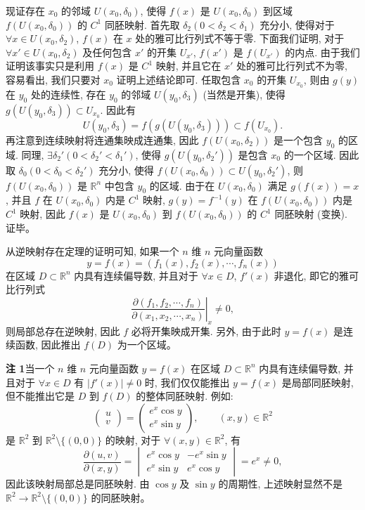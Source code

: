 \documentclass[UTF8, 12pt, fontset=fandol, oneside]{ctexart}
\begin{document}
现证存在 $x_0$ 的邻域 $U(x_0,\delta_0)$, 使得 $f(x)$ 是 $U(x_0,\delta_0)$ 到区域 $f(U(x_0,\delta_0))$ 的 $C^1$ 同胚映射. 首先取 $\delta_2(0<\delta_2<\delta_1)$ 充分小, 使得对于 $\forall x\in U(x_0,\delta_2)$, $f(x)$ 在 $x$ 处的雅可比行列式不等于零. 下面我们证明, 对于 $\forall x'\in U(x_0,\delta_2)$ 及任何包含 $x'$ 的开集 $U_{x'}$, $f(x')$ 是 $f(U_{x'})$ 的内点. 由于我们证明该事实只是利用 $f(x)$ 是 $C^1$ 映射, 并且它在 $x'$ 处的雅可比行列式不为零, 容易看出, 我们只要对 $x_0$ 证明上述结论即可. 任取包含 $x_0$ 的开集 $U_{x_0}$, 则由 $g(y)$ 在 $y_0$ 处的连续性, 存在 $y_0$ 的邻域 $U(y_0,\delta_3)$ (当然是开集), 使得 $g(U(y_0,\delta_3))\subset U_{x_0}$. 因此有
\[
  U(y_0,\delta_3)=f(g(U(y_0,\delta_3)))\subset f(U_{x_0}).
\]
再注意到连续映射将连通集映成连通集, 因此 $f(U(x_0,\delta_2))$ 是一个包含 $y_0$ 的区域. 同理, $\exists\delta_2'(0<\delta_2'<\delta_1')$, 使得 $g(U(y_0,\delta_2'))$ 是包含 $x_0$ 的一个区域. 因此取 $\delta_0(0<\delta_0<\delta_2')$ 充分小, 使得 $f(U(x_0,\delta_0))\subset U(y_0,\delta_2')$, 则 $f(U(x_0,\delta_0))$ 是 $\mathbb R^n$ 中包含 $y_0$ 的区域. 由于在 $U(x_0,\delta_0)$ 满足 $g(f(x))=x$, 并且 $f$ 在 $U(x_0,\delta_0)$ 内是 $C^1$ 映射, $g(y)=f^{-1}(y)$ 在 $f(U(x_0,\delta_0))$ 内是 $C^1$ 映射, 因此 $f(x)$ 是 $U(x_0,\delta_0)$ 到 $f(U(x_0,\delta_0))$ 的 $C^1$ 同胚映射 (变换). 证毕。

从逆映射存在定理的证明可知, 如果一个 $n$ 维 $n$ 元向量函数
\[
  y=f(x)=(f_1(x),f_2(x),\cdots,f_n(x))
\]
在区域 $D\subset\mathbb R^n$ 内具有连续偏导数, 并且对于 $\forall x\in D$, $f'(x)$ 非退化, 即它的雅可比行列式
\[
  \left.
  \frac{\partial(f_1,f_2,\cdots,f_n)}
       {\partial(x_1,x_2,\cdots,x_n)}
  \right|_x
  \ne0,
\]
则局部总存在逆映射, 因此 $f$ 必将开集映成开集. 另外, 由于此时 $y=f(x)$ 是连续函数, 因此推出 $f(D)$ 为一个区域。

\noindent\textbf{注 1}\quad 当一个 $n$ 维 $n$ 元向量函数 $y=f(x)$ 在区域 $D\subset\mathbb R^n$ 内具有连续偏导数, 并且对于 $\forall x\in D$ 有 $|f'(x)|\ne0$ 时, 我们仅仅能推出 $y=f(x)$ 是局部同胚映射, 但不能推出它是 $D$ 到 $f(D)$ 的整体同胚映射. 例如:
\[
  \begin{pmatrix}
    u\\
    v
  \end{pmatrix}
  =
  \begin{pmatrix}
    e^x\cos y\\
    e^x\sin y
  \end{pmatrix},
  \qquad (x,y)\in\mathbb R^2
\]
是 $\mathbb R^2$ 到 $\mathbb R^2\setminus\{(0,0)\}$ 的映射, 对于 $\forall(x,y)\in\mathbb R^2$, 有
\[
  \frac{\partial(u,v)}{\partial(x,y)}
  =
  \begin{vmatrix}
    e^x\cos y & -e^x\sin y\\
    e^x\sin y & e^x\cos y
  \end{vmatrix}
  =e^x\ne0,
\]
因此该映射局部总是同胚映射. 由 $\cos y$ 及 $\sin y$ 的周期性, 上述映射显然不是 $\mathbb R^2\to\mathbb R^2\setminus\{(0,0)\}$ 的同胚映射。
\end{document}
